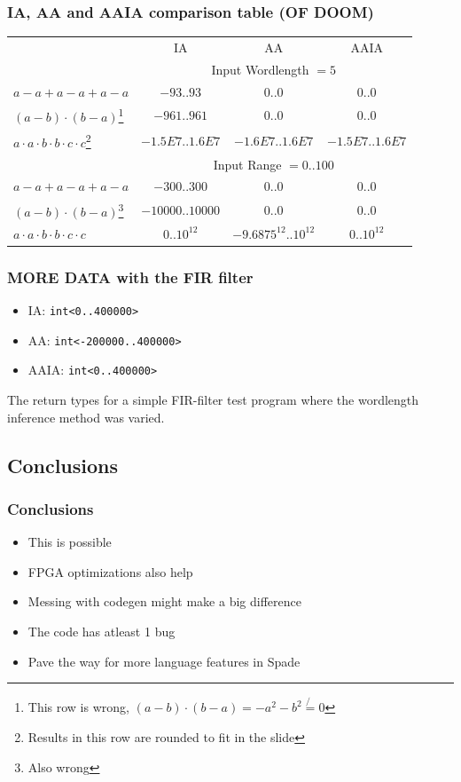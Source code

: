 \documentclass{beamer}
\begin{document}
\begin{frame}[containsverbatim]
\frametitle{IA, AA and AAIA comparison table (OF DOOM)}
\footnotesize
\begin{tabular}{l | c c c}
                                  & IA     & AA     & AAIA    \\
                                  & \multicolumn{3}{c}{Input Wordlength $= 5$} \\
  \hline
  $a - a + a - a + a - a$   & $-93..93$ & $0..0$          & $0..0$       \\
  $(a - b) \cdot (b - a)$\footnote[2]{This row is wrong, $(a - b) \cdot (b - a) = -a^2 -b^2 \not{=} 0$} & $-961..961$ & $0..0$           & $0..0$       \\
  $a \cdot a \cdot b \cdot b \cdot c \cdot c$\footnote[1]{Results in this row are rounded to fit in the slide} & $-1.5E7..1.6E7$      & $-1.6E7..1.6E7$      & $-1.5E7..1.6E7$ \\[0.7em]
                                  & \multicolumn{3}{c}{Input Range $= 0..100$} \\
  \hline
  $a - a + a - a + a - a$   & $-300..300$ & $0..0$          & $0..0$       \\
  $(a - b) \cdot (b - a)$\footnote[4]{Also wrong}             & $-10000..10000$ & $0..0$           & $0..0$       \\
  $a \cdot a \cdot b \cdot b \cdot c \cdot c$         & $0..10^{12}$      & $-9.6875^{12}..10^{12}$      & $0..10^{12}$
\end{tabular}
\end{frame}

\begin{frame}[containsverbatim]
\frametitle{MORE DATA with the FIR filter}
\begin{itemize}
  \item IA: \verb+int<0..400000>+
  \item AA: \verb+int<-200000..400000>+
  \item AAIA: \verb+int<0..400000>+
\end{itemize}
The return types for a simple FIR-filter test program where the wordlength inference method was varied.
\end{frame}

\subsection{Conclusions}

\begin{frame}[containsverbatim]
\frametitle{Conclusions}
\begin{itemize}
  \item This is possible
  \item FPGA  optimizations also help
  \item Messing with codegen might make a big difference
  \item The code has atleast 1 bug
  \item Pave the way for more language features in Spade
\end{itemize}
\end{frame}
\end{document}
